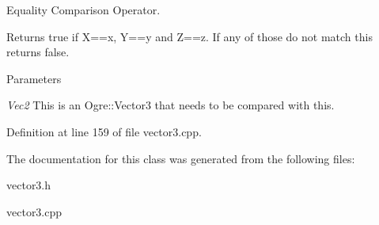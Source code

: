 Equality Comparison Operator. 

Returns true if X==x, Y==y and Z==z. If any of those do not match this returns false. 
\begin{DoxyParams}{Parameters}
\item[{\em Vec2}]This is an Ogre::Vector3 that needs to be compared with this. \end{DoxyParams}


Definition at line 159 of file vector3.cpp.



The documentation for this class was generated from the following files:\begin{DoxyCompactItemize}
\item 
vector3.h\item 
vector3.cpp\end{DoxyCompactItemize}
